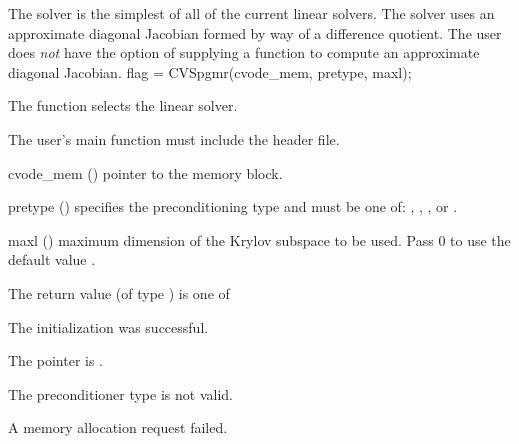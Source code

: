 {
  The {\cvdiag} solver is the simplest of all of the current {\cvodes} linear solvers. 
  The {\cvdiag} solver uses an approximate diagonal Jacobian formed by way of a
  difference quotient. The user does {\em not} have the option of supplying a
  function to compute an approximate diagonal Jacobian.
}
{
  flag = CVSpgmr(cvode\_mem, pretype, maxl);
}
{
  The function  selects the {\cvspgmr} linear solver. 

  The user's main function must include the  header file.
}
{
  \begin{args}
  \item[cvode\_mem] ()
    pointer to the {\cvodes} memory block.
  \item[pretype] ()
    specifies the preconditioning type and must be one of: 
    , , , or .
  \item[maxl] ()
    maximum dimension of the Krylov subspace to be used. Pass $0$ to use the 
    default value .
  \end{args}
}
{
  The return value  (of type ) is one of
  \begin{args}
  \item[\Id{CVSPGMR\_SUCCESS}] 
    The {\cvspgmr} initialization was successful.
  \item[\Id{CVSPGMR\_MEM\_NULL}]
    The  pointer is .
  \item[\Id{CVSPGMR\_ILL\_INPUT}]
    The preconditioner type  is not valid.
  \item[\Id{CVSPGMR\_MEM\_FAIL}]
    A memory allocation request failed.
  \end{args}
}

